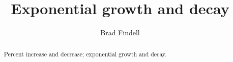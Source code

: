 \documentclass[nooutcomes]{ximera}
\title{Exponential growth and decay}
\author{Brad Findell}
\begin{document}
\begin{abstract}
Percent increase and decrease; exponential growth and decay. %
\end{abstract}
\maketitle




\end{document}
